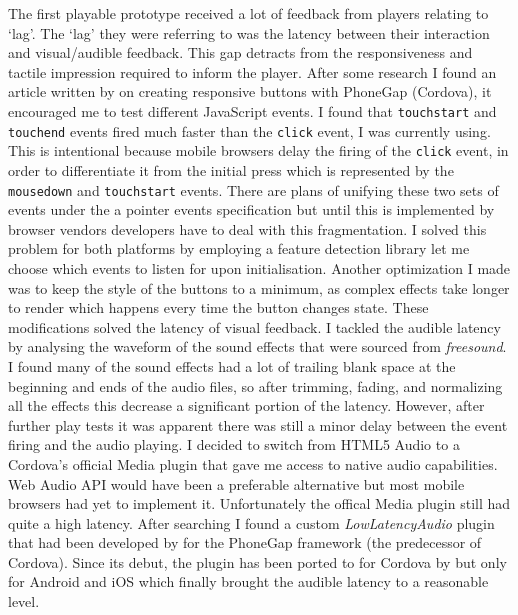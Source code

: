 \documentclass[final]{cmpreport}
\begin{document}
The first playable prototype received a lot of feedback from players relating to `lag'. The `lag' they were referring to was the latency between their interaction and visual/audible feedback. This gap detracts from the responsiveness and tactile impression required to inform the player. After some research I found an article written by \cite{Croft} on creating responsive buttons with PhoneGap (Cordova), it encouraged me to test different JavaScript events. I found that \texttt{touchstart} and \texttt{touchend} events fired much faster than the \texttt{click} event, I was currently using. This is intentional because mobile browsers delay the firing of the \texttt{click} event, in order to differentiate it from the initial press which is represented by the \texttt{mousedown} and \texttt{touchstart} events. There are plans of unifying these two sets of events under the a pointer events specification but until this is implemented by browser vendors developers have to deal with this fragmentation. I solved this problem for both platforms by employing a feature detection library let me choose which events to listen for upon initialisation. Another optimization I made was to keep the style of the buttons to a minimum, as complex effects take longer to render which happens every time the button changes state. These modifications solved the latency of visual feedback. I tackled the audible latency by analysing the waveform of the sound effects that were sourced from \textit{freesound}. I found many of the sound effects had a lot of trailing blank space at the beginning and ends of the audio files, so after trimming, fading, and normalizing all the effects this decrease a significant portion of the latency. However, after further play tests it was apparent there was still a minor delay between the event firing and the audio playing. I decided to switch from HTML5 Audio to a Cordova's official Media plugin that gave me access to native audio capabilities. Web Audio API would have been a preferable alternative but most mobile browsers had yet to implement it. Unfortunately the offical Media plugin still had quite a high latency. After searching I found a custom \textit{LowLatencyAudio} plugin that had been developed by \citep{Trice} for the PhoneGap framework (the predecessor of Cordova). Since its debut, the plugin has been ported to for Cordova by \citep{Xie} but only for Android and iOS which finally brought the audible latency to a reasonable level.
\end{document}
